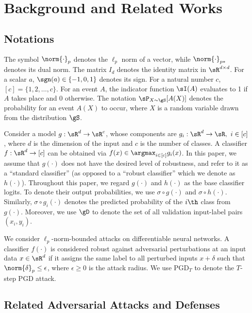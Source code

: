 \documentclass[11pt, letterpaper]{article}
\theoremstyle{plain}
\theoremstyle{definition}
\begin{document}
\section{Background and Related Works}


\subsection{Notations}

The symbol $\norm{\cdot}_p$ denotes the $\ell_p$ norm of a vector, while $\norm{\cdot}_{p*}$ denotes its dual norm. The matrix $I_d$ denotes the identity matrix in $\sR^{d \times d}$. For a scalar $a$, $\sgn (a) \in \{ -1, 0, 1 \}$ denotes its sign. For a natural number $c$, $[c] = \{1, 2, \dots, c\}$. For an event $A$, the indicator function $\sI (A)$ evaluates to 1 if $A$ takes place and 0 otherwise. The notation $\sP_{X\sim \gS} [A (X)]$ denotes the probability for an event $A (X)$ to occur, where $X$ is a random variable drawn from the distribution $\gS$.

Consider a model $g: \sR^d \to \sR^c$, whose components are $g_i: \sR^d \to \sR,\ i \in [c]$, where $d$ is the dimension of the input and $c$ is the number of classes. A classifier $f: \sR^d \to [c]$ can be obtained via $f(x) \in \argmax_{i\in[c]} g_i (x)$. In this paper, we assume that $g (\cdot)$ does not have the desired level of robustness, and refer to it as a ``standard classifier'' (as opposed to a ``robust classifier'' which we denote as $h (\cdot)$). Throughout this paper, we regard $g (\cdot)$ and $h (\cdot)$ as the base classifier logits. To denote their output probabilities, we use $\sigma \circ g (\cdot)$ and $\sigma \circ h (\cdot)$. Similarly, $\sigma \circ g_i (\cdot)$ denotes the predicted probability of the $i\th$ class from $g (\cdot)$. Moreover, we use $\gD$ to denote the set of all validation input-label pairs $(x_i, y_i)$.

We consider $\ell_p$-norm-bounded attacks on differentiable neural networks. A classifier $f (\cdot)$ is considered robust against adversarial perturbations at an input data $x \in \sR^d$ if it assigns the same label to all perturbed inputs $x+\delta$ such that $\norm{\delta}_p \leq \epsilon$, where $\epsilon \geq 0$ is the attack radius. We use PGD$_T$ to denote the $T$-step PGD attack.


\subsection{Related Adversarial Attacks and Defenses}
\end{document}
